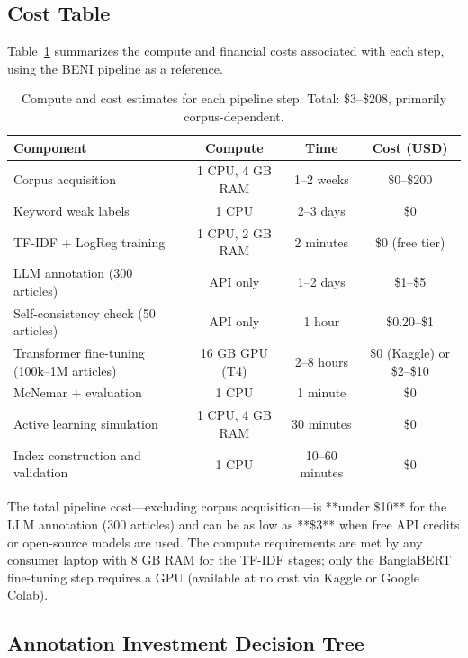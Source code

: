 \subsection{Cost Table}\label{sec:cost-table}

Table~\ref{tab:costs} summarizes the compute and financial costs associated with each step, using the BENI pipeline as a reference.

\begin{table}[h]
\centering
\small
\begin{tabular}{lccc}
\toprule
Component & Compute & Time & Cost (USD) \\
\midrule
Corpus acquisition & 1 CPU, 4 GB RAM & 1--2 weeks & \$0--\$200 \\
Keyword weak labels & 1 CPU & 2--3 days & \$0 \\
TF-IDF + LogReg training & 1 CPU, 2 GB RAM & 2 minutes & \$0 (free tier) \\
LLM annotation (300 articles) & API only & 1--2 days & \$1--\$5 \\
Self-consistency check (50 articles) & API only & 1 hour & \$0.20--\$1 \\
Transformer fine-tuning (100k--1M articles) & 16 GB GPU (T4) & 2--8 hours & \$0 (Kaggle) or \$2--\$10 \\
McNemar + evaluation & 1 CPU & 1 minute & \$0 \\
Active learning simulation & 1 CPU, 4 GB RAM & 30 minutes & \$0 \\
Index construction and validation & 1 CPU & 10--60 minutes & \$0 \\
\bottomrule
\end{tabular}
\caption{Compute and cost estimates for each pipeline step. Total: \$3--\$208, primarily corpus-dependent.}
\label{tab:costs}
\end{table}

The total pipeline cost---excluding corpus acquisition---is **under \$10** for the LLM annotation (300 articles) and can be as low as **\$3** when free API credits or open-source models are used. The compute requirements are met by any consumer laptop with 8 GB RAM for the TF-IDF stages; only the BanglaBERT fine-tuning step requires a GPU (available at no cost via Kaggle or Google Colab).

\subsection{Annotation Investment Decision Tree}\label{sec:investment-decision}

